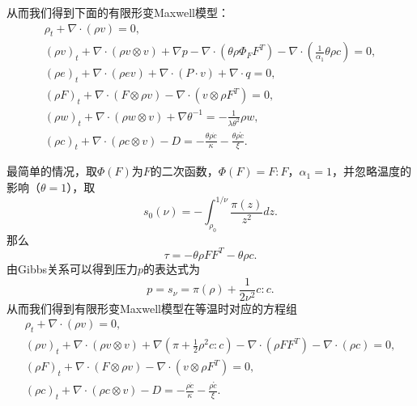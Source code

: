 从而我们得到下面的有限形变Maxwell模型：
\begin{subequations}\label{eq:lingen}
  \begin{align}
  \rho_t + \nabla \cdot (\rho v) = 0, \\
  (\rho v)_t + \nabla \cdot ( \rho v \otimes v) + \nabla p - \nabla \cdot (\theta \rho \Phi_F F^T) - \nabla \cdot (\frac{1}{\alpha_1}\theta \rho c) = 0, \\
  (\rho e)_t + \nabla \cdot (\rho e v) + \nabla \cdot (P \cdot v) + \nabla \cdot q = 0, \\
  (\rho F)_t + \nabla \cdot (F \otimes \rho v) - \nabla \cdot (v \otimes \rho F^T) = 0, \\
  (\rho w)_t + \nabla \cdot (\rho w \otimes v) + \nabla \theta^{-1} = -\frac{1}{\lambda \theta^2} \rho w, \\
  (\rho c)_t + \nabla \cdot (\rho c \otimes v) - D  = -\frac{\theta \rho \dot{c}}{\kappa}  -\frac{\theta \rho \mathring{c}}{\xi}.
\end{align}
\end{subequations}

最简单的情况，取$\Phi(F)$为$F$的二次函数，$\Phi(F) = F:F$，$\alpha_1=1$，并忽略温度的影响（$\theta=1$），取
\begin{equation*}
    s_0(\nu) = -\int_{\rho_0}^{1/\nu} \frac{\pi(z)}{z^2} dz.
\end{equation*}
那么
\begin{equation*}
	\tau = -\theta \rho F F^T - \theta {\rho c}.%
\end{equation*}
由Gibbs关系可以得到压力$p$的表达式为
\begin{equation*}
    p = s_\nu = \pi(\rho) + \frac{1}{2\nu^2} c:c.
\end{equation*}
从而我们得到有限形变Maxwell模型在等温时对应的方程组
\begin{subequations}\label{eq:compressibleRelax}
  \begin{align}
  \rho_t + \nabla \cdot (\rho v) = 0, \\
  (\rho v)_t + \nabla \cdot ( \rho v \otimes v) + \nabla (\pi + \frac{1}{2}\rho^2c:c) - \nabla \cdot (\rho F F^T) - \nabla \cdot (\rho c) = 0, \\
    (\rho F)_t + \nabla \cdot (F \otimes \rho v) - \nabla \cdot (v \otimes \rho F^T) = 0, \\
  (\rho c)_t + \nabla \cdot (\rho c \otimes v) - D  = -\frac{ \rho \dot{c}}{\kappa}  -\frac{ \rho \mathring{c}}{\xi}.
\end{align}
\end{subequations}



